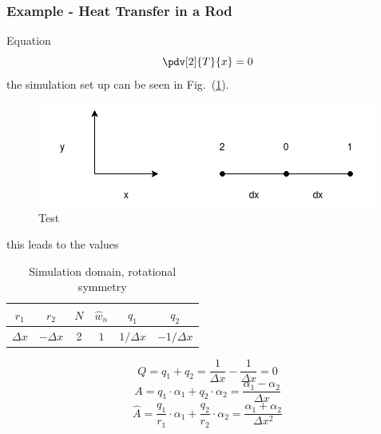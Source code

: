 \subsubsection{Example - Heat Transfer in a Rod}
Equation
\begin{equation}
	\pdv[2]{T}{x} = 0
\end{equation}
the simulation set up can be seen in Fig.~(\ref{fig:rod_heat_transfer}).
\begin{figure}[ht]
    \label{fig:rod_heat_transfer}
    \centering
    \includegraphics[width=0.8\linewidth]{rod.png}
    \caption{Test}
\end{figure}
this leads to the values
\begin{table}[ht]
	\centering
    \caption{Simulation domain, rotational symmetry}
    \begin{tabular}{cccccc}
    	\hline
    	$r_1$ & $r_2$ & $N$ & $\hat{w}_n$ & $q_1$ & $q_2$ \\
    	\hline\hline
    	$\Delta x$ & $-\Delta x$ & \num{2} & $1$ & $1/\Delta x$ & $-1/\Delta x$ \\
    	\hline
    \end{tabular}
\end{table}
\begin{equation}
	Q = q_{1} + q_{2} = \frac{1}{\Delta x} - \frac{1}{\Delta x} = 0
\end{equation}
\begin{equation}
	A = q_1\cdot \alpha_1 + q_2 \cdot \alpha_2 =  \frac{\alpha_1 - \alpha_2}{\Delta x}
\end{equation}
\begin{equation}
	\hat{A} = \frac{q_1}{r_1} \cdot \alpha_1 + \frac{q_2}{r_2} \cdot \alpha_2 =  \frac{\alpha_1  + \alpha_2}{\Delta x^2}
\end{equation}
